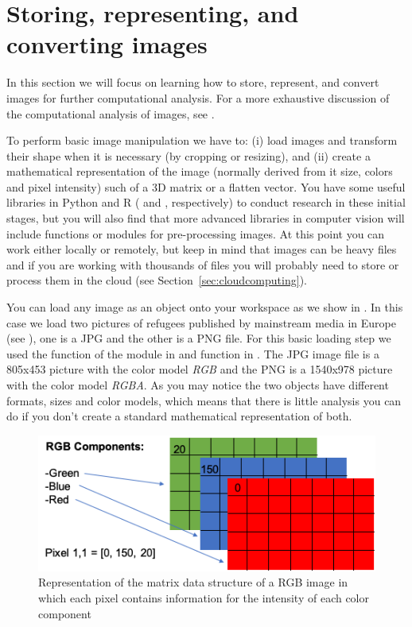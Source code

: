 \section{Storing, representing, and converting images}
\label{sec:storing}

In this section we will focus on learning how to store, represent, and convert images for further computational analysis. For a more exhaustive discussion of the computational analysis of images, see \citet{williams2020images}.

To perform basic image manipulation we have to: (i) load images and transform their shape when it is necessary (by cropping or resizing), and (ii) create a mathematical representation of the image (normally derived from it size, colors and pixel intensity) such of a 3D matrix or a flatten vector. You have some useful libraries in Python and R ( and , respectively) to conduct research in these initial stages, but you will also find that more advanced libraries in computer vision will include functions or modules for pre-processing images. At this point you can work either locally or remotely, but keep in mind that images can be heavy files and if you are working with thousands of files you will probably need to store or process them in the cloud (see Section~\ref{sec:cloudcomputing}).

You can load any image as an object onto your workspace as we show in . In this case we load two pictures of refugees published by mainstream media in Europe (see \citet{amores2019visual}), one is a JPG and the other is a PNG file. For this basic loading step we used the  function of the  module in  and  function in . The JPG image file is a 805x453 picture with the color model \textit{RGB} and the PNG is a 1540x978 picture with the color model \textit{RGBA}. As you may notice the two objects have different formats, sizes and color models, which means that there is little analysis you can do if you don't create a standard mathematical representation of both. 


\begin{figure}
\centering
\includegraphics[width=0.9\linewidth]{figures/ch15_pixel.png}
\caption{Representation of the matrix data structure of a RGB image in which each pixel contains information for the intensity of each color component}
\label{fig:pixel}
\end{figure}

